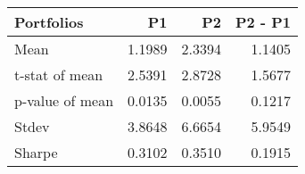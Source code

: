 \begin{tabular}{lrrr}
\toprule
Portfolios & P1 & P2 & P2 - P1 \\
\midrule
Mean & 1.1989 & 2.3394 & 1.1405 \\
t-stat of mean & 2.5391 & 2.8728 & 1.5677 \\
p-value of mean & 0.0135 & 0.0055 & 0.1217 \\
Stdev & 3.8648 & 6.6654 & 5.9549 \\
Sharpe & 0.3102 & 0.3510 & 0.1915 \\
\bottomrule
\end{tabular}
